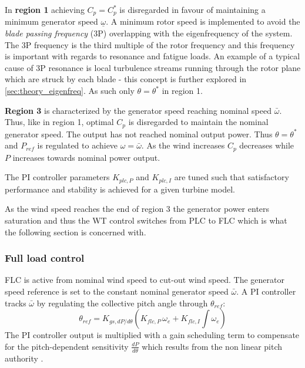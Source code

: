 In \textbf{region 1} achieving $ C_p = C_p^* $ is disregarded in favour of maintaining a minimum generator speed $ \underline{\omega} $. A minimum rotor speed is implemented to avoid the \textit{blade passing frequency} (3P) overlapping with the eigenfrequency of the system. The 3P frequency is the third multiple of the rotor frequency and this frequency is important with regards to resonance and fatigue loads. An example of a typical cause of 3P resonance is local turbulence streams running through the rotor plane which are struck by each blade - this concept is further explored in \cref{sec:theory_eigenfreq}. As such only $ \theta = \theta^* $ in region 1.

\textbf{Region 3} is characterized by the generator speed reaching nominal speed $ \bar{\omega} $. Thus, like in region 1, optimal $ C_p $ is disregarded to maintain the nominal generator speed. The output  has not reached nominal output power. Thus $ \theta = \theta^* $ and $ P_{ref} $ is regulated to achieve $ \omega = \bar{\omega} $. As the wind increases $ C_p $ decreases while $ P $ increases towards nominal power output. 

The PI controller parameters $ K_{plc,P} $ and $ K_{plc,I} $ are tuned such that satisfactory performance and stability is achieved for a given turbine model. 

As the wind speed reaches the end of region 3 the generator power enters saturation and thus the WT control switches from PLC to FLC which is what the following section is concerned with.


\subsubsection{Full load control} \label{sec:theory_ctrl_flc}
FLC is active from nominal wind speed to cut-out wind speed. The generator speed reference is set to the constant nominal generator speed $ \bar{\omega} $. A PI controller tracks $ \bar{\omega} $ by regulating the collective pitch angle through $ \theta_{ref} $:
\begin{equation}\label{eq:pi_flc_ctrl}
	\theta_{ref} = K_{gs,dP/d\theta} \left(K_{flc,P} \, \omega_e + K_{flc,I} \int \omega_e\right)
\end{equation}
The PI controller output is multiplied with a gain scheduling term to compensate for the pitch-dependent sensitivity $ \frac{dP}{d\theta} $ which results from the non linear pitch authority \cite{Pao2009}. 

